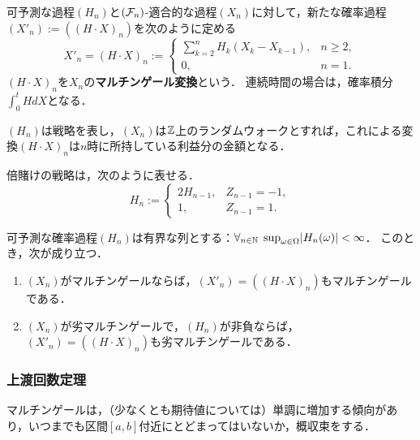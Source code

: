 \documentclass[uplatex,dvipdfmx]{jsreport}
\begin{document}
\begin{definition}
    可予測な過程$(H_n)$と$(\mathcal{F}_n)$-適合的な過程$(X_n)$に対して，新たな確率過程$(X'_n):=((H\cdot X)_n)$を次のように定める
    \[X'_n=(H\cdot X)_n:=\begin{cases}
        \sum^n_{k=2}H_k(X_k-X_{k-1}),&n\ge 2,\\
        0,&n=1.
    \end{cases}\]
    $(H\cdot X)_n$を$X_n$の\textbf{マルチンゲール変換}という．
    連続時間の場合は，確率積分$\int^t_0HdX$となる．
\end{definition}
\begin{remarks}
    $(H_n)$は戦略を表し，$(X_n)$は$\mathbb{Z}$上のランダムウォークとすれば，これによる変換$(H\cdot X)_n$は$n$時に所持している利益分の金額となる．
\end{remarks}

\begin{example}
    倍賭けの戦略は，次のように表せる．
    \[H_n:=\begin{cases}
        2H_{n-1},&Z_{n-1}=-1,\\
        1,&Z_{n-1}=1.
    \end{cases}\]
\end{example}

\begin{theorem}
    可予測な確率過程$(H_n)$は有界な列とする：$\forall_{n\in\mathbb{N}}\;\sup_{\omega\in\Omega}\lvert H_n(\omega)\rvert<\infty$．
    このとき，次が成り立つ．
    \begin{enumerate}
        \item $(X_n)$がマルチンゲールならば，$(X'_n)=((H\cdot X)_n)$もマルチンゲールである．
        \item $(X_n)$が劣マルチンゲールで，$(H_n)$が非負ならば，$(X'_n)=((H\cdot X)_n)$も劣マルチンゲールである．
    \end{enumerate}
\end{theorem}

\subsubsection{上渡回数定理}

\begin{tcolorbox}[colframe=ForestGreen, colback=ForestGreen!10!white,breakable,colbacktitle=ForestGreen!40!white,coltitle=black,fonttitle=\bfseries\sffamily,
title=]
    マルチンゲールは，（少なくとも期待値については）単調に増加する傾向があり，いつまでも区間$[a,b]$付近にとどまってはいないか，概収束をする．
\end{tcolorbox}
\end{document}
